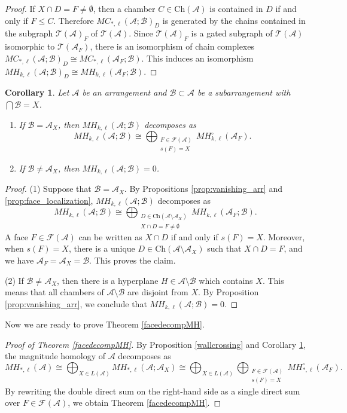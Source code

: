 \documentclass{amsart}
\numberwithin{equation}{section}
\newtheorem{cor}[thm]{Corollary}
\theoremstyle{plain}
\theoremstyle{remark}
\theoremstyle{definition}
\numberwithin{equation}{section}
\newcommand{\A}{\mathcal{A}}
\newcommand{\B}{\mathcal{B}}
\newcommand{\Ch}{\mathrm{Ch}}
\begin{document}
\begin{proof}
    If $X\cap D=F\neq \emptyset$, then a chamber $C\in \Ch(\A)$ is contained in $D$ if and only if $F\leq C$.
    Therefore $MC_{*,\ell}(\A;\B)_D$ is generated by the chains contained in the subgraph $\mathcal{T}(\A)_F$ of $\mathcal{T}(\A)$.
    Since $\mathcal{T}(\A)_F$ is a gated subgraph of $\mathcal{T}(\A)$ isomorphic to $\mathcal{T}(\A_F)$, there is an isomorphism of chain complexes $MC_{*,\ell}(\A;\B)_D\cong MC_{*,\ell}(\A_F;\B)$.
    This induces an isomorphism $MH_{k,\ell}(\A;\B)_D\cong MH_{k,\ell}(\A_F;\B)$.
\end{proof}

\begin{cor}\label{cor:MH_with_support}
    Let $\A$ be an arrangement and $\B\subset \A$ be a subarrangement with $\bigcap\B=X$.
    \begin{enumerate}
        \item If $\B=\A_X$, then $MH_{k,\ell}(\A;\B)$ decomposes as
        \[
        MH_{k,\ell}(\A;\B)\cong \bigoplus_{\substack{F\in \mathcal{F}(\A)\\s(F)=X}}MH^\circ_{k,\ell}(\A_F).
        \]
        \item If $\B\neq \A_X$, then $MH_{k,\ell}(\A;\B)=0$.
    \end{enumerate}
\end{cor}

\begin{proof}
    (1) Suppose that $\B=\A_X$.
        By Propositions \ref{prop:vanishing_arr} and \ref{prop:face_localization}, $MH_{k,\ell}(\A;\B)$ decomposes as
        \[
        MH_{k,\ell}(\A;\B)\cong \bigoplus_{\substack{D\in \Ch(\A\setminus\A_X)\\X\cap D=F\neq \emptyset}}MH_{k,\ell}(\A_F;\B).
        \]
        A face $F\in \mathcal{F}(\A)$ can be written as $X\cap D$ if and only if $s(F)=X$.
        Moreover, when $s(F)=X$, there is a unique $D\in \Ch(\A\setminus\A_X)$ such that $X\cap D=F$, and we have $\A_F=\A_X=\B$.
        This proves the claim.
    
    (2) If $\B\neq \A_X$, then there is a hyperplane $H\in \A\setminus \B$ which contains $X$.
        This means that all chambers of $\A\setminus\B$ are disjoint from $X$.
        By Proposition \ref{prop:vanishing_arr}, we conclude that $MH_{k,\ell}(\A;\B)=0$.
\end{proof}

Now we are ready to prove Theorem \ref{facedecompMH}.

\begin{proof}[Proof of Theorem \ref{facedecompMH}]
    By Proposition \ref{wallcrossing} and Corollary \ref{cor:MH_with_support}, the magnitude homology of $\A$ decomposes as
    \[
    MH_{*,\ell}(\A)\cong\bigoplus_{X\in L(\A)}MH_{*,\ell}(\A;\A_X)\cong\bigoplus_{X\in L(\A)}\bigoplus_{\substack{F\in \mathcal{F}(\A)\\s(F)=X}}MH^\circ_{*,\ell}(\A_F).
    \]
    By rewriting the double direct sum on the right-hand side as a single direct sum over $F\in \mathcal{F}(\A)$, we obtain Theorem \ref{facedecompMH}.
\end{proof}
\end{document}
